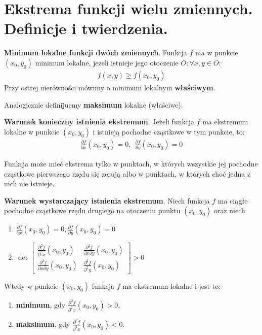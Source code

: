 \documentclass[main.tex]{subfiles}
\begin{document}
    \newpage


    \section{Ekstrema funkcji wielu zmiennych. Definicje i twierdzenia.}

    \begin{definition}
        \textbf{Minimum lokalne funkcji dwóch zmiennych}.
        Funkcja $f$ ma w punkcie $(x_0, y_0)$ minimum lokalne, jeżeli istnieje jego otoczenie
        $O: \forall x, y \in O$:
        \begin{align*}
            f(x,y) \geq f(x_0, y_0)
        \end{align*}
        Przy ostrej nierówności mówimy o minimum lokalnym \textbf{właściwym}.

        Analogicznie definijuemy \textbf{maksimum} lokalne (właściwe).
    \end{definition}

    \begin{theorem}
        \textbf{Warunek konieczny istnienia ekstremum}. Jeżeli funkcja $f$ ma ekstremum lokalne w punkcie $(x_0, y_0)$
        i istnieją pochodne cząstkowe w tym punkcie, to:
        \begin{align*}
            \frac{\partial f}{\partial x}(x_0, y_0) = 0, ~~ \frac{\partial f}{\partial y}(x_0, y_0) = 0
        \end{align*}

        Funkcja może mieć ekstrema tylko w punktach, w których wszystkie jej pochodne cząstkowe pierwszego rzędu się
        zerują albo w punktach, w których choć jedna z nich nie istnieje.
    \end{theorem}

    \begin{theorem}
        \textbf{Warunek wystarczający istnienia ekstremum}. Niech funkcja $f$ ma ciągłe pochodne cząstkowe rzędu drugiego
        na otoczeniu punktu $(x_0, y_0)$ oraz niech
        \begin{enumerate}
            \item $\frac{\partial f}{\partial x}(x_0, y_0) = 0, \frac{\partial f}{\partial y}(x_0, y_0) = 0$
            \item $\det \begin{bmatrix}
                            \frac{\partial^2 f}{\partial^2 x}(x_0, y_0) & \frac{\partial^2 f}{\partial x \partial y}(x_0, y_0) \\
                            \frac{\partial^2 f}{\partial x \partial y}(x_0, y_0) & \frac{\partial^2 f}{\partial^2 y}(x_0, y_0)
            \end{bmatrix} > 0$
        \end{enumerate}
        Wtedy w punkcie $(x_0, y_0)$ funkcja $f$ ma ekstremum lokalne i jest to:
        \begin{enumerate}
            \item \textbf{minimum}, gdy $\frac{\partial^2 f}{\partial^2 x}(x_0, y_0) > 0$,
            \item \textbf{maksimum}, gdy $\frac{\partial^2 f}{\partial^2 x}(x_0, y_0) < 0$.
        \end{enumerate}
    \end{theorem}
\end{document}
